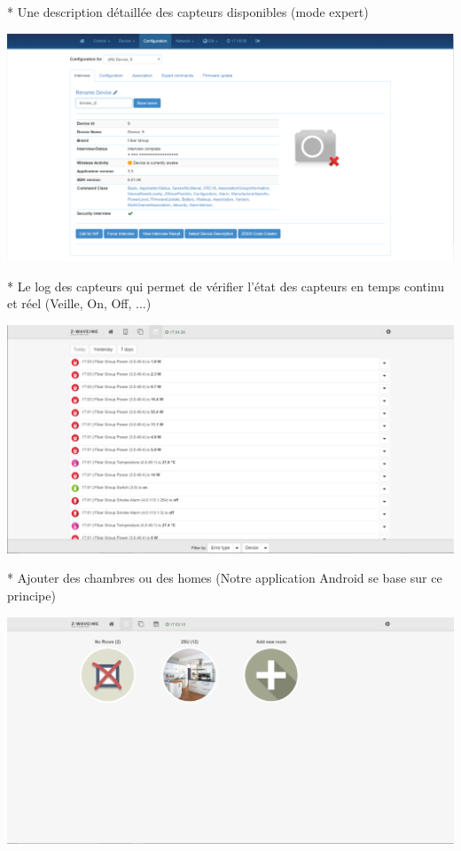 * Une description détaillée des capteurs disponibles (mode expert)

\includegraphics[scale=0.5]{./Images/png/description_zwaveme.png}\newline

* Le log des capteurs qui permet de vérifier l'état des capteurs en temps continu et réel (Veille, On, Off, ...)


\includegraphics[scale=0.5]{./Images/png/log_zwaveme.png}\newline

* Ajouter des chambres ou des homes (Notre application Android se base sur ce principe)

\includegraphics[scale=0.5]{./Images/png/room_zwaveme.png}\newline

